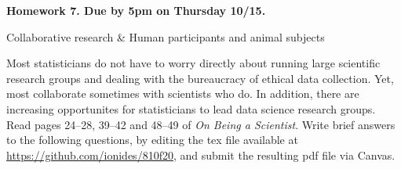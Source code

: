 \documentclass[12pt]{article}
\begin{document}
\begin{center}\bf
Homework 7. Due by 5pm on Thursday 10/15.

Collaborative research \& Human participants and animal subjects

\end{center}
Most statisticians do not have to worry directly about running large scientific research groups and dealing with the bureaucracy of ethical data collection. Yet, most collaborate sometimes with scientists who do. In addition, there are increasing opportunites for statisticians to lead data science research groups. Read pages 24--28, 39--42 and 48--49 of {\em On Being a Scientist}.  Write brief answers to the following questions, by editing the tex file available at \url{https://github.com/ionides/810f20}, and submit the resulting pdf file via Canvas.
\end{document}
